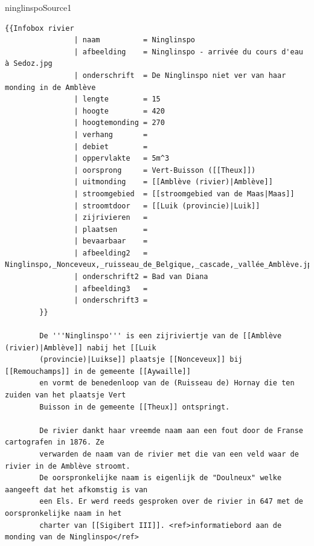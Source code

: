 \documentclass[presentatie.tex]{subfiles}
\begin{document}
    \begin{saveblock}{ninglinspoSource1}
        \begin{Verbatim}[tabsize=4,gobble=8]
        {{Infobox rivier
                | naam          = Ninglinspo
                | afbeelding    = Ninglinspo - arrivée du cours d'eau à Sedoz.jpg
                | onderschrift  = De Ninglinspo niet ver van haar monding in de Amblève
                | lengte        = 15
                | hoogte        = 420
                | hoogtemonding = 270
                | verhang       = 
                | debiet        = 
                | oppervlakte   = 5m^3
                | oorsprong     = Vert-Buisson ([[Theux]])
                | uitmonding    = [[Amblève (rivier)|Amblève]]
                | stroomgebied  = [[stroomgebied van de Maas|Maas]]
                | stroomtdoor   = [[Luik (provincie)|Luik]]
                | zijrivieren   = 
                | plaatsen      = 
                | bevaarbaar    = 
                | afbeelding2   = Ninglinspo,_Nonceveux,_ruisseau_de_Belgique,_cascade,_vallée_Amblève.jpg
                | onderschrift2 = Bad van Diana
                | afbeelding3   = 
                | onderschrift3 = 
        }}

        De '''Ninglinspo''' is een zijriviertje van de [[Amblève (rivier)|Amblève]] nabij het [[Luik
        (provincie)|Luikse]] plaatsje [[Nonceveux]] bij [[Remouchamps]] in de gemeente [[Aywaille]]
        en vormt de benedenloop van de (Ruisseau de) Hornay die ten zuiden van het plaatsje Vert
        Buisson in de gemeente [[Theux]] ontspringt.
        
        De rivier dankt haar vreemde naam aan een fout door de Franse cartografen in 1876. Ze
        verwarden de naam van de rivier met die van een veld waar de rivier in de Amblève stroomt.
        De oorspronkelijke naam is eigenlijk de "Doulneux" welke aangeeft dat het afkomstig is van
        een Els. Er werd reeds gesproken over de rivier in 647 met de oorspronkelijke naam in het
        charter van [[Sigibert III]]. <ref>informatiebord aan de monding van de Ninglinspo</ref>
        \end{Verbatim}
    \end{saveblock}
\end{document}

